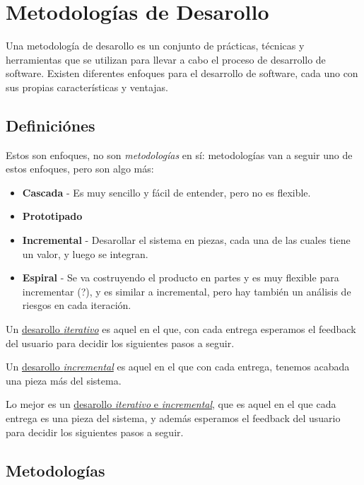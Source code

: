 \chapter{Metodologías de Desarollo}

Una metodología de desarollo es un conjunto de prácticas, técnicas y herramientas que se utilizan para llevar a cabo el proceso de desarrollo de software. Existen diferentes enfoques para el desarrollo de software, cada uno con sus propias características y ventajas.

\section{Definiciónes}

{Estos son enfoques, no son \textit{metodologías} en sí: metodologías van a seguir uno de estos enfoques, pero son algo más:\ns
\begin{itemize}
   \item \textbf{Cascada} - Es muy sencillo y fácil de entender, pero no es flexible.
   \item \textbf{Prototipado}
   \item \textbf{Incremental} - Desarollar el sistema en piezas, cada una de las cuales tiene un valor, y luego se integran.
   \item \textbf{Espiral} - Se va costruyendo el producto en partes y es muy flexible para incrementar (?), y es similar a incremental, pero hay también un análisis de riesgos en cada iteración.
\end{itemize}}

Un \ul{desarollo \textit{iterativo}} es aquel en el que, con cada entrega esperamos el feedback del usuario para decidir los siguientes pasos a seguir.

Un \ul{desarollo \textit{incremental}} es aquel en el que con cada entrega, tenemos acabada una pieza más del sistema.

Lo mejor es un \ul{desarollo \textit{iterativo} e \textit{incremental}}, que es aquel en el que cada entrega es una pieza del sistema, y además esperamos el feedback del usuario para decidir los siguientes pasos a seguir.

\section{Metodologías}

